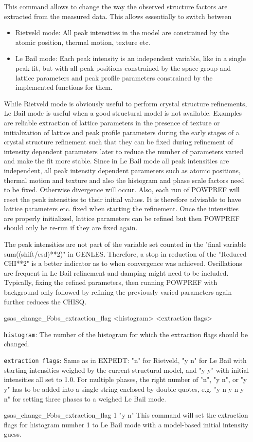 {
This command allows to change the way the observed structure factors are extracted from the measured data. This allows essentially to switch between 
\begin{itemize}
\item Rietveld mode: All peak intensities in the model are constrained by the atomic position, thermal motion, texture etc.
\item Le Bail mode: Each peak intensity is an independent variable, like in a single peak fit, but with all peak positions constrained by the space group and lattice parameters and peak profile parameters constrained by the implemented functions for them.
\end{itemize}
While Rietveld mode is obviously useful to perform crystal structure refinements, Le Bail mode is useful when a good structural model is not available. Examples are reliable extraction of lattice parameters in the presence of texture or initialization of lattice and peak profile parameters during the early stages of a crystal structure refinement such that they can be fixed during refinement of intensity dependent parameters later to reduce the number of parameters varied and make the fit more stable. Since in Le Bail mode all peak intensities are independent, all peak intensity dependent parameters such as atomic positions, thermal motion and texture and also the histogram and phase scale factors need to be fixed. Otherwise divergence will occur. Also, each run of POWPREF will reset the peak intensities to their initial values. It is therefore advisable to have lattice parameters etc. fixed when starting the refinement. Once the intensities are properly initialized, lattice parameters can be refined but then POWPREF should only be re-run if they are fixed again.

The peak intensities are not part of the variable set counted in the "final variable sum((shift/esd)**2)" in GENLES. Therefore, a stop in reduction of the "Reduced CHI**2" is a better indicator as to when convergence was achieved. Oscillations are frequent in Le Bail refinement and damping might need to be included. Typically, fixing the refined parameters, then running POWPREF with background only followed by refining the previously varied parameters again further reduces the CHISQ.
}{
gsas\_change\_Fobs\_extraction\_flag <histogram> <extraction flags>
}{
\item \texttt{histogram}: The number of the histogram for which the extraction flags should be changed.
\item \texttt{extraction flags}: Same as in EXPEDT: "n" for Rietveld, "y n" for Le Bail with starting intensities weighed by the current structural model, and "y y" with initial intensities all set to 1.0. For multiple phases, the right number of "n", "y n", or "y y" has to be added into a single string enclosed by double quotes, e.g. "y n y n y n" for setting three phases to a weighed Le Bail mode.
}{
gsas\_change\_Fobs\_extraction\_flag 1 "y n"
}{
This command will set the extraction flags for histogram number 1 to Le Bail mode with a model-based initial intensity guess.
}


